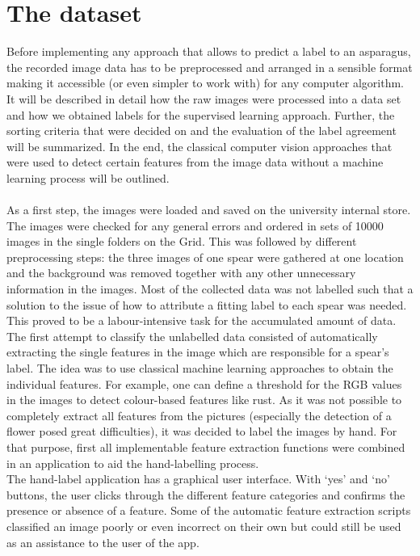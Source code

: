 \section{The dataset}
\label{ch:Dataset}

Before implementing any approach that allows to predict a label to an asparagus, the recorded image data has to be preprocessed and arranged in a sensible format making it accessible (or even simpler to work with) for any computer algorithm.
It will be described in detail how the raw images were processed into a data set and how we obtained labels for the supervised learning approach. Further, the sorting criteria that were decided on and the evaluation of the label agreement will be summarized. In the end, the classical computer vision approaches that were used to detect certain features from the image data without a machine learning process will be outlined. \\
\\
As a first step, the images were loaded and saved on the university internal store. The images were checked for any general errors and ordered in sets of 10000 images in the single folders on the Grid.
This was followed by different preprocessing steps: the three images of one spear were gathered at one location and the background was removed together with any other unnecessary information in the images. Most of the collected data was not labelled such that a solution to the issue of how to attribute a fitting label to each spear was needed. This proved to be a labour-intensive task for the accumulated amount of data.
The first attempt to classify the unlabelled data consisted of automatically extracting the single features in the image which are responsible for a spear’s label. The idea was to use classical machine learning approaches to obtain the individual features. For example, one can define a threshold for the RGB values in the images to detect colour-based features like rust. As it was not possible to completely extract all features from the pictures (especially the detection of a flower posed great difficulties), it was decided to label the images by hand. For that purpose, first all implementable feature extraction functions were combined in an application to aid the hand-labelling process. \\
The hand-label application has a graphical user interface. With ‘yes’ and ‘no’ buttons, the user clicks through the different feature categories and confirms the presence or absence of a feature. Some of the automatic feature extraction scripts classified an image poorly or even incorrect on their own but could still be used as an assistance to the user of the app. \\
